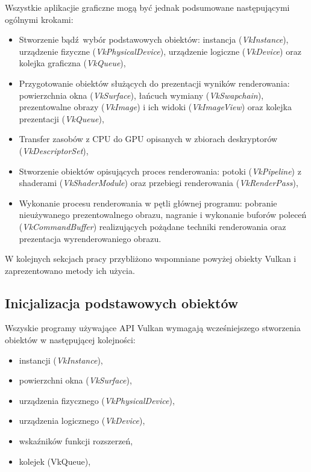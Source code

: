 Wszystkie aplikacjie graficzne mogą być jednak podsumowane następującymi ogólnymi krokami:
\begin{itemize}
	\item Stworzenie bądź wybór podstawowych obiektów: instancja (\textit{VkInstance}), urządzenie fizyczne (\textit{VkPhysicalDevice}), urządzenie logiczne (\textit{VkDevice}) oraz kolejka graficzna (\textit{VkQueue}),
	\item Przygotowanie obiektów służących do prezentacji wyników renderowania: powierzchnia okna (\textit{VkSurface}), łańcuch wymiany (\textit{VkSwapchain}), prezentowalne obrazy (\textit{VkImage}) i ich widoki (\textit{VkImageView}) oraz kolejka prezentacji (\textit{VkQueue}),
	\item Transfer zasobów z CPU do GPU opisanych w zbiorach deskryptorów (\textit{VkDescriptorSet}),
	\item Stworzenie obiektów opisujących proces renderowania: potoki (\textit{VkPipeline}) z shaderami (\textit{VkShaderModule}) oraz przebiegi renderowania (\textit{VkRenderPass}),
	\item Wykonanie procesu renderowania w pętli głównej programu: pobranie nieużywanego prezentowalnego obrazu, nagranie i wykonanie buforów poleceń (\textit{VkCommandBuffer}) realizujących pożądane techniki renderowania oraz prezentacja wyrenderowaniego obrazu.
\end{itemize}

W kolejnych sekcjach pracy przybliżono wspomniane powyżej obiekty Vulkan i zaprezentowano metody ich użycia.


\subsection{Inicjalizacja podstawowych obiektów}

Wszyskie programy używające API Vulkan wymagają wcześniejszego stworzenia obiektów w następującej kolejności:
\begin{itemize}
	\item instancji (\textit{VkInstance}),
	\item powierzchni okna (\textit{VkSurface}),
	\item urządzenia fizycznego (\textit{VkPhysicalDevice}),
	\item urządzenia logicznego (\textit{VkDevice}),
	\item wskaźników funkcji rozszerzeń,
	\item kolejek (VkQueue),
\end{itemize}

